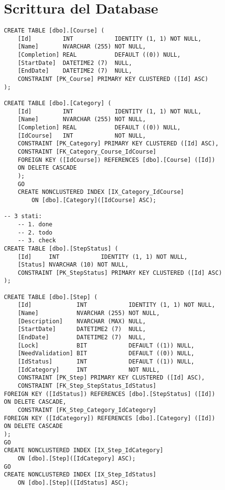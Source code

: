 \chapter{Scrittura del Database}
%
\label{appendice-database}
\begin{lstlisting}[style=sql_style, caption=esempio sezione codice Javascript per la creazione di un grafico a barre per la rappresentazione dei dati]
CREATE TABLE [dbo].[Course] ( 
    [Id]         INT            IDENTITY (1, 1) NOT NULL, 
    [Name]       NVARCHAR (255) NOT NULL, 
    [Completion] REAL           DEFAULT ((0)) NULL, 
    [StartDate]  DATETIME2 (7)  NULL, 
    [EndDate]    DATETIME2 (7)  NULL, 
    CONSTRAINT [PK_Course] PRIMARY KEY CLUSTERED ([Id] ASC) 
); 

CREATE TABLE [dbo].[Category] ( 
    [Id]         INT            IDENTITY (1, 1) NOT NULL, 
    [Name]       NVARCHAR (255) NOT NULL, 
    [Completion] REAL           DEFAULT ((0)) NULL, 
    [IdCourse]   INT            NOT NULL, 
    CONSTRAINT [PK_Category] PRIMARY KEY CLUSTERED ([Id] ASC), 
    CONSTRAINT [FK_Category_Course_IdCourse]
    FOREIGN KEY ([IdCourse]) REFERENCES [dbo].[Course] ([Id]) 
    ON DELETE CASCADE 
    ); 
    GO 
    CREATE NONCLUSTERED INDEX [IX_Category_IdCourse] 
        ON [dbo].[Category]([IdCourse] ASC); 	

-- 3 stati: 
    -- 1. done 
    -- 2. todo 
    -- 3. check 
CREATE TABLE [dbo].[StepStatus] ( 
    [Id]     INT            IDENTITY (1, 1) NOT NULL, 
    [Status] NVARCHAR (10) NOT NULL, 
    CONSTRAINT [PK_StepStatus] PRIMARY KEY CLUSTERED ([Id] ASC) 
); 

CREATE TABLE [dbo].[Step] ( 
    [Id]             INT            IDENTITY (1, 1) NOT NULL, 
    [Name]           NVARCHAR (255) NOT NULL, 
    [Description]    NVARCHAR (MAX) NULL, 
    [StartDate]      DATETIME2 (7)  NULL, 
    [EndDate]        DATETIME2 (7)  NULL, 
    [Lock]           BIT            DEFAULT ((1)) NULL, 
    [NeedValidation] BIT            DEFAULT ((0)) NULL, 
    [IdStatus]       INT            DEFAULT ((1)) NULL, 
    [IdCategory]     INT            NOT NULL, 
    CONSTRAINT [PK_Step] PRIMARY KEY CLUSTERED ([Id] ASC), 
    CONSTRAINT [FK_Step_StepStatus_IdStatus]  
FOREIGN KEY ([IdStatus]) REFERENCES [dbo].[StepStatus] ([Id]) 
ON DELETE CASCADE, 
    CONSTRAINT [FK_Step_Category_IdCategory]  
FOREIGN KEY ([IdCategory]) REFERENCES [dbo].[Category] ([Id]) 
ON DELETE CASCADE 
); 
GO 
CREATE NONCLUSTERED INDEX [IX_Step_IdCategory] 
    ON [dbo].[Step]([IdCategory] ASC); 
GO 
CREATE NONCLUSTERED INDEX [IX_Step_IdStatus] 
    ON [dbo].[Step]([IdStatus] ASC); 


\end{lstlisting}
